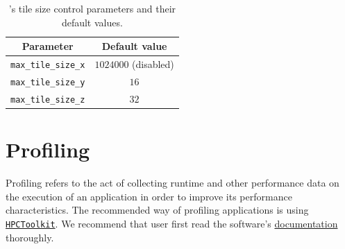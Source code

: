 \begin{table}[h]
  \centering
  \begin{tabular}{cc}
    Parameter                   & Default value        \\\hline\hline
    \texttt{max\_tile\_size\_x} & $1024000$ (disabled) \\
    \texttt{max\_tile\_size\_y} & $16$                 \\
    \texttt{max\_tile\_size\_z} & $32$                 \\\hline\hline
  \end{tabular}
  \caption{\CarpetX's tile size control parameters and their default values.}
  \label{tab:tile_sizes}
\end{table}


\section{Profiling}
\label{sec:profiling}

Profiling refers to the act of collecting runtime and other performance data on the execution of an application in order to improve its performance characteristics. The recommended way of profiling \CarpetX\space applications is using \href{http://hpctoolkit.org/}{\texttt{HPCToolkit}}. We recommend that user first read the software's \href{http://hpctoolkit.org/manual/HPCToolkit-users-manual.pdf}{documentation} thoroughly. 

